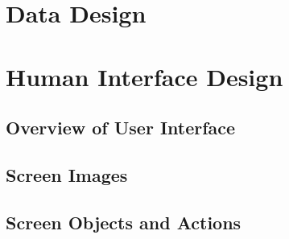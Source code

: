 \section{Data Design} %
\label{sec:section_name}
\label{sec:component_design}

\section{Human Interface Design} %
\label{sec:human_interface_design}
\subsection{Overview of User Interface} %
\label{sub:overview_of_user_interface}

\subsection{Screen Images} %
\label{sub:screen_images}

\subsection{Screen Objects and Actions} %
\label{sub:screen_objects_and_actions}
